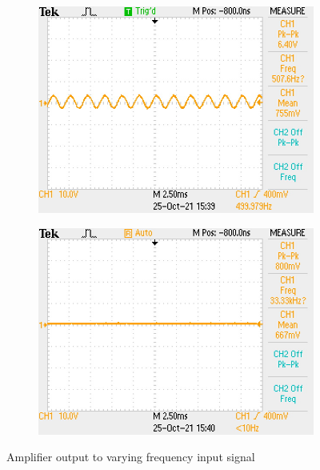 \documentclass[a4paper,11pt]{article}
\begin{document}
\begin{figure}[h!]
\begin{subfigure}{0.3\textwidth}
        \includegraphics[width=\columnwidth]{power_output/filter_output_500Hz.JPG}
    \end{subfigure}
    \begin{subfigure}{0.3\textwidth}
        \includegraphics[width=\columnwidth]{power_output/filter_output_2kHz.JPG}
    \end{subfigure}
    \caption{Amplifier output to varying frequency input signal}
\end{figure}
\end{document}
